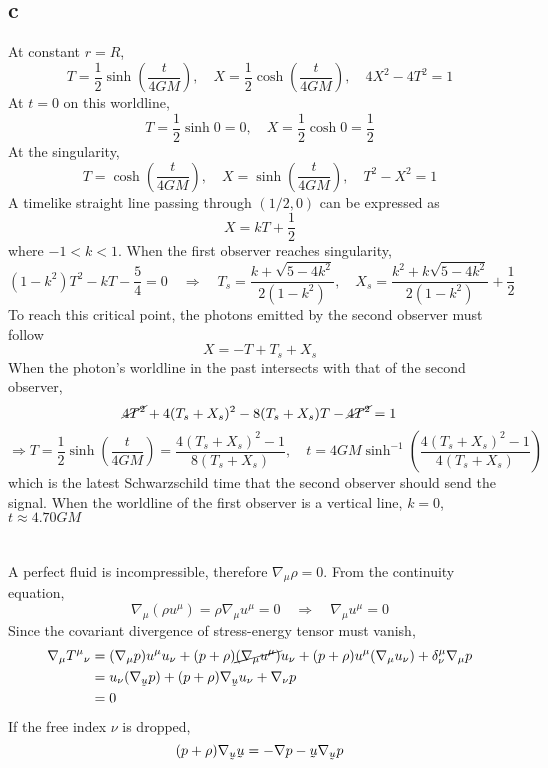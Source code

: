 \documentclass{article}
\newcommand{\ut}[1]{\underaccent{\tilde}{#1}}
\begin{document}
\subsection*{c}
At constant $r = R$,
\[  T = \frac{1}{2}\sinh\left( \frac{t}{4GM} \right), \quad X = \frac{1}{2}\cosh\left( \frac{t}{4GM} \right)
	,\quad 4X^2 - 4T^2 = 1 \]
At $t = 0$ on this worldline,
\[ T = \frac{1}{2}\sinh0 = 0, \quad X = \frac{1}{2}\cosh0 = \frac{1}{2} \]
At the singularity,
\[ T = \cosh\left( \frac{t}{4GM} \right),\quad X = \sinh\left( \frac{t}{4GM} \right), \quad T^2 - X^2 = 1 \]
A timelike straight line passing through $(1/2, 0)$ can be expressed as 
\[ X = kT + \frac{1}{2}\]
where $-1 < k< 1$. When the first observer reaches singularity,
\[ (1- k^2)T^2 - kT - \frac{5}{4} = 0 \quad\Rightarrow\quad \boxed{T_s = \frac{k + \sqrt{5-4k^2}}{2(1-k^2)},\quad
	X_s = \frac{k^2 + k\sqrt{5-4k^2}}{2(1-k^2)} + \frac{1}{2}}\]
To reach this critical point, the photons emitted by the second observer must follow
\[ X  = - T + T_s + X_s \]
When the photon's worldline in the past intersects with that of the second observer,
\[ \cancel{4T^2} + 4(T_s + X_s)^2 -8(T_s+X_s)T - \cancel{4T^2} = 1\]
\[ \Rightarrow T = \frac{1}{2}\sinh\left( \frac{t}{4GM} \right)  = \frac{4(T_s+X_s)^2 - 1}{8(T_s + X_s)}
	,\quad \boxed{t = 4GM\sinh^{-1}\left(\frac{4(T_s+X_s)^2 - 1}{4(T_s + X_s)}\right)} \]
which is the latest Schwarzschild time that the second observer should send the signal. When the worldline of the first observer is a vertical line, $k=0$, $t \approx 4.70GM$
\section{}
A perfect fluid is incompressible, therefore $\nabla_\mu \rho = 0$. From the continuity equation,
\[ \nabla_\mu(\rho u^\mu) =  \rho \nabla_\mu u^\mu = 0 \quad\Rightarrow\quad \nabla_\mu u^\mu = 0\]
Since the covariant divergence of stress-energy tensor must vanish,
\begin{align*}
\nabla_\mu T^\mu{}_\nu &= (\nabla_\mu p) u^\mu u_\nu + (p+\rho) \cancel{(\nabla_\mu u^\mu)} u_\nu + (p+\rho) u^\mu (\nabla_\mu u_\nu) + \delta^\mu_\nu \nabla_\mu p \\
&=  u_\nu (\nabla_{\ut{u}} p)  + (p+\rho) \nabla_{\ut{u}} u_\nu + \nabla_\nu p \\
&= 0
\end{align*}
If the free index $\nu$ is dropped,
\[ (p + \rho)\nabla_{\ut{u}}\ut{u} = - \nabla p - \ut{u}\nabla_{\ut{u}}p \]
\end{document}
